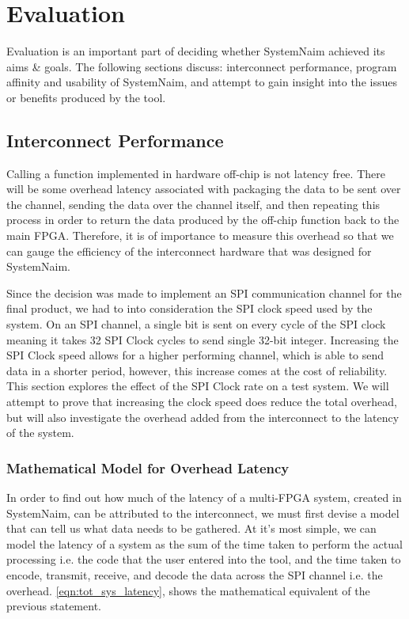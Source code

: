 \chapter{Evaluation}
\label{chp:eval}

Evaluation is an important part of deciding whether SystemNaim achieved its aims \& goals. The following sections discuss: interconnect performance, program affinity and usability of SystemNaim, and attempt to gain insight into the issues or benefits produced by the tool.

\section{Interconnect Performance}
\label{sec:interconnect}

Calling a function implemented in hardware off-chip is not latency free. There will be some overhead latency associated with packaging the data to be sent over the channel, sending the data over the channel itself, and then repeating this process in order to return the data produced by the off-chip function back to the main FPGA. Therefore, it is of importance to measure this overhead so that we can gauge the efficiency of the interconnect hardware that was designed for SystemNaim.

Since the decision was made to implement an SPI communication channel for the final product, we had to into consideration the SPI clock speed used by the system. On an SPI channel, a single bit is sent on every cycle of the SPI clock meaning it takes 32 SPI Clock cycles to send single 32-bit integer. Increasing the SPI Clock speed allows for a higher performing channel, which is able to send data in a shorter period, however, this increase comes at the cost of reliability. This section explores the effect of the SPI Clock rate on a test system. We will attempt to prove that increasing the clock speed does reduce the total overhead, but will also investigate the overhead added from the interconnect to the latency of the system.

\subsection{Mathematical Model for Overhead Latency}

In order to find out how much of the latency of a multi-FPGA system, created in SystemNaim, can be attributed to the interconnect, we must first devise a model that can tell us what data needs to be gathered. At it's most simple, we can model the latency of a system as the sum of the time taken to perform the actual processing i.e. the code that the user entered into the tool, and the time taken to encode, transmit, receive, and decode the data across the SPI channel i.e. the overhead. \autoref{eqn:tot_sys_latency}, shows the mathematical equivalent of the previous statement.

